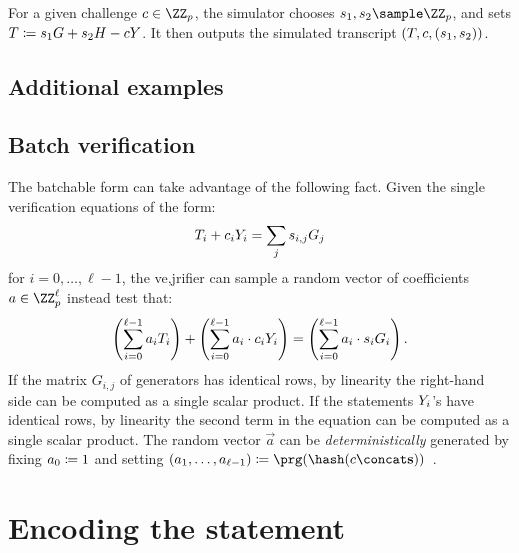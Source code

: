 \documentclass[11pt]{article}
\begin{document}
For a given challenge $c\in\ZZ_p$, the simulator chooses $s_1,s_2\sample\ZZ_p$, and sets $T\coloneqq s_1G + s_2H -cY$.
It then outputs the simulated transcript $(T,c,(s_1,s_2))$.

\subsection{Additional examples}



\subsection{Batch verification}

The batchable form can take advantage of the following fact.
Given the single verification equations of the form:
\[
   T_i + c_i Y_i = \sum_j s_{i, j} G_j
\]
for $i=0, \dots,\ell-1$,
the ve,jrifier can sample a random vector of coefficients $a \in \ZZ_p^\ell$ instead test that:
\[
  \left(\sum_{i=0}^{\ell-1} a_i T_i\right) + \left(\sum_{i=0}^{\ell-1} a_i \cdot  c_i Y_i \right) = \left(\sum_{i=0}^{\ell-1} a_i \cdot s_i G_i\right).
\]
If the matrix $G_{i, j}$ of generators has identical rows, by linearity the right-hand side can be computed as a single scalar product.
If the statements $Y_i$'s have identical rows, by linearity the second term in the equation can be computed as a single scalar product.
The random vector $\vec a$ can be \emph{deterministically} generated by fixing $a_0 \coloneqq 1$ and setting $(a_1, \dots, a_{\ell-1}) \defeq \prg(\hash(\challenge \concat \vec s))$~\cite{bip-schnorr}.



\section{Encoding the statement}
\end{document}
